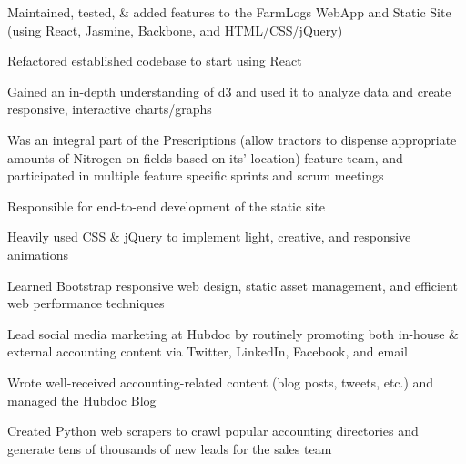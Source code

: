 \documentclass[letterpaper]{deedy-resume} %
\begin{document}
\begin{minipage}[t]{0.66\textwidth}

  \begin{tightitemize}
  \item Maintained, tested, \& added features to the FarmLogs WebApp and Static Site (using React, Jasmine, Backbone, and HTML/CSS/jQuery)
  \item Refactored established codebase to start using React
  \item Gained an in-depth understanding of d3 and used it to analyze data and create responsive, interactive charts/graphs
  \item Was an integral part of the Prescriptions (allow tractors to dispense appropriate amounts of Nitrogen on fields based on its' location) feature team, and participated in multiple feature specific sprints and scrum meetings
  \end{tightitemize}

  \sectionspace %



  \begin{tightitemize}
  \item Responsible for end-to-end development of the static site
  \item Heavily used CSS \& jQuery to implement light, creative, and responsive animations
  \item Learned Bootstrap responsive web design, static asset management, and efficient web performance techniques
  \item Lead social media marketing at Hubdoc by routinely promoting both in-house \& external accounting content via Twitter, LinkedIn, Facebook, and email
  \item Wrote well-received accounting-related content (blog posts, tweets, etc.) and managed the Hubdoc Blog
  \item Created Python web scrapers to crawl popular accounting directories and generate tens of thousands of new leads for the sales team
  \end{tightitemize}

  \sectionspace %
  


\end{minipage}
\end{document}
